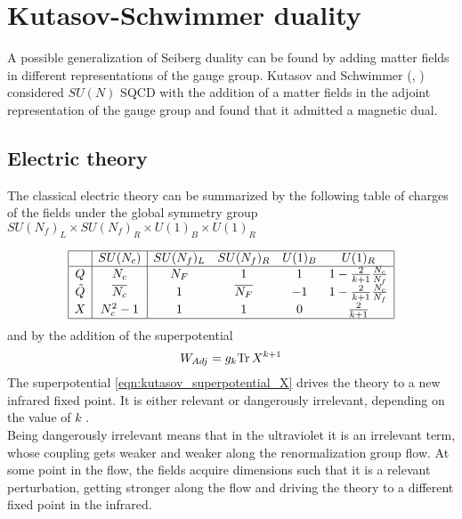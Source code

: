 


\section{Kutasov-Schwimmer duality}

A possible generalization of Seiberg duality can be found by adding matter fields in different representations of the gauge group.
Kutasov and Schwimmer (\cite{Kutasov:1995ve}, \cite{Kutasov:1995np}) considered $SU(N)$ SQCD with the addition of a matter fields in the adjoint representation of the gauge group and found that it admitted a magnetic dual.

\subsection{Electric theory }
The classical electric theory can be summarized by the following table of charges of the fields under the global symmetry group $SU(N_f)_L \times SU(N_f)_R \times U(1)_B \times U(1)_R
$

\begin{equation}
\begin{array}{| c | c | c c c c | }
\hline
 & SU(N_c) &SU(N_f)_L  &SU(N_f)_R   & U(1)_B &  U(1)_R \\
\hline
Q & N_c&N_F & 1   &  1  &  1 - \frac{2}{k+1} \frac{N_c}{N_f}  \\
\tilde{Q} & \overline{N_c} &  1 & \overline{ N_F}   & -1   &   1 - \frac{2}{k+1} \frac{N_c}{N_f}    \\
X & N_c^2-1 & 1   & 1    & 0   &  \frac{2}{k+1} \\
\hline
\end{array}
\centering
\label{table:charge_table_el_ks_4d}
\end{equation}
and by the addition of the superpotential
\begin{equation}
	W_{Adj} = g_k \mathrm{Tr } \,{X^{k+1}}
	\label{eqn:kutasov_superpotential_X}
\end{equation}
The superpotential \eqref{eqn:kutasov_superpotential_X} drives the theory to a new infrared fixed point. It is either relevant or dangerously irrelevant, depending on the value of $k$ \cite{Kutasov:1995np}. \\
Being dangerously irrelevant means that in the ultraviolet it is an irrelevant term, whose coupling gets weaker and weaker along the renormalization group flow.
At some point in the flow, the fields acquire dimensions such that it is a relevant perturbation, getting stronger along the flow and driving the theory to a different fixed point in the infrared.

